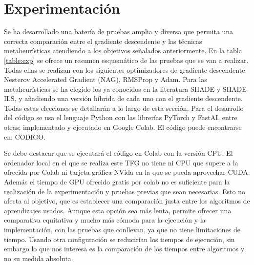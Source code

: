 \section{Experimentación}

Se ha desarrollado una batería de pruebas amplia y diversa que permita una correcta comparación entre el gradiente descendente y las técnicas metaheurísticas atendiendo a los objetivos señalados anteriormente. En la tabla \ref{table:exp} se ofrece un resumen esquemático de las pruebas que se van a realizar. Todas ellas se realizan con los siguientes optimizadores de gradiente descendente: Nesterov Accelerated Gradient (NAG), RMSProp y Adam. Para las metaheurísticas se ha elegido los ya conocidos en la literatura SHADE y SHADE-ILS, y añadiendo una versión híbrida de cada uno con el gradiente descendente. Todas estas elecciones se detallarán a lo largo de esta sección. Para el desarrollo del código se usa el lenguaje Python con las librerías PyTorch y FastAI, entre otras; implementado y ejecutado en Google Colab. El código puede encontrarse en: CODIGO.

Se debe destacar que se ejecutará el código en Colab con la versión CPU. El ordenador local en el que se realiza este TFG no tiene ni CPU que supere a la ofrecida por Colab ni tarjeta gráfica NVida en la que se pueda aprovechar CUDA. Además el tiempo de GPU ofrecido gratis por colab no es suficiente para la realización de la experimentación y pruebas previas que sean necesarias. Esto no afecta al objetivo, que es establecer una comparación justa entre los algoritmos de aprendizajes usados. Aunque esta opción sea más lenta, permite ofrecer una comparativa equitativa y mucho más cómoda para la ejecución y la implementación, con las pruebas que conllevan, ya que no tiene limitaciones de tiempo. Usando otra configuración se reducirían los tiempos de ejecución, sin embargo lo que nos interesa es la comparación de los tiempos entre algoritmos y no su medida absoluta.


